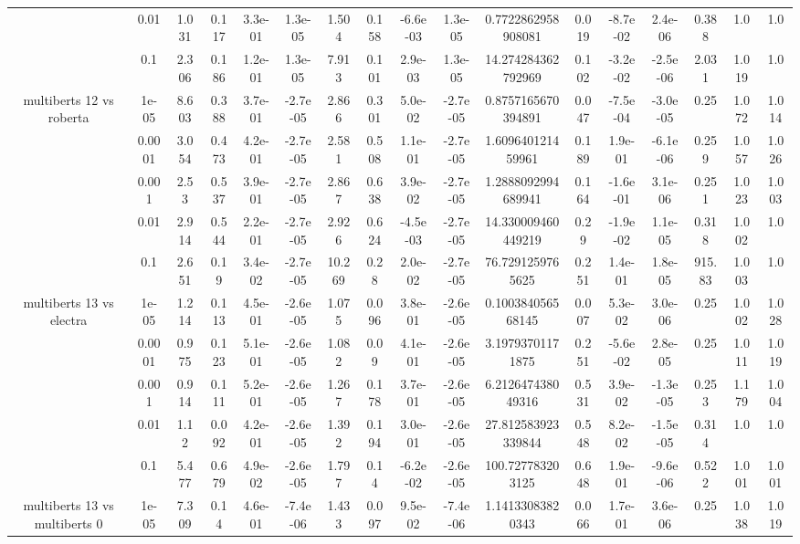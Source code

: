 \begin{tabular}{|c|c|c|c|c|c|c|c|c|c|c|c|c|c|c|c|c|}
 & 0.01 & 1.031 & 0.117 & 3.3e-01 & 1.3e-05 & 1.504 & 0.158 & -6.6e-03 & 1.3e-05 & 0.7722862958908081 & 0.019 & -8.7e-02 & 2.4e-06 & 0.388 & 1.0 & 1.0 \\
 & 0.1 & 2.306 & 0.186 & 1.2e-01 & 1.3e-05 & 7.913 & 0.101 & 2.9e-03 & 1.3e-05 & 14.274284362792969 & 0.102 & -3.2e-02 & -2.5e-06 & 2.031 & 1.019 & 1.0 \\
\hline
\multirow{5}{*}{multiberts 12 vs roberta } & 1e-05 & 8.603 & 0.388 & 3.7e-01 & -2.7e-05 & 2.866 & 0.301 & 5.0e-02 & -2.7e-05 & 0.8757165670394891 & 0.047 & -7.5e-04 & -3.0e-05 & 0.25 & 1.072 & 1.014 \\
 & 0.0001 & 3.054 & 0.473 & 4.2e-01 & -2.7e-05 & 2.581 & 0.508 & 1.1e-01 & -2.7e-05 & 1.609640121459961 & 0.189 & 1.9e-01 & -6.1e-06 & 0.259 & 1.057 & 1.026 \\
 & 0.001 & 2.53 & 0.537 & 3.9e-01 & -2.7e-05 & 2.867 & 0.638 & 3.9e-02 & -2.7e-05 & 1.2888092994689941 & 0.164 & -1.6e-01 & 3.1e-06 & 0.251 & 1.023 & 1.003 \\
 & 0.01 & 2.914 & 0.544 & 2.2e-01 & -2.7e-05 & 2.926 & 0.624 & -4.5e-03 & -2.7e-05 & 14.330009460449219 & 0.29 & -1.9e-02 & 1.1e-05 & 0.318 & 1.002 & 1.0 \\
 & 0.1 & 2.651 & 0.19 & 3.4e-02 & -2.7e-05 & 10.269 & 0.28 & 2.0e-02 & -2.7e-05 & 76.7291259765625 & 0.251 & 1.4e-01 & 1.8e-05 & 915.83 & 1.003 & 1.0 \\
\hline
\multirow{5}{*}{multiberts 13 vs electra } & 1e-05 & 1.214 & 0.113 & 4.5e-01 & -2.6e-05 & 1.075 & 0.096 & 3.8e-01 & -2.6e-05 & 0.100384056568145 & 0.007 & 5.3e-02 & 3.0e-06 & 0.25 & 1.002 & 1.028 \\
 & 0.0001 & 0.975 & 0.123 & 5.1e-01 & -2.6e-05 & 1.082 & 0.09 & 4.1e-01 & -2.6e-05 & 3.19793701171875 & 0.251 & -5.6e-02 & 2.8e-05 & 0.25 & 1.011 & 1.019 \\
 & 0.001 & 0.914 & 0.111 & 5.2e-01 & -2.6e-05 & 1.267 & 0.178 & 3.7e-01 & -2.6e-05 & 6.212647438049316 & 0.531 & 3.9e-02 & -1.3e-05 & 0.253 & 1.179 & 1.004 \\
 & 0.01 & 1.12 & 0.092 & 4.2e-01 & -2.6e-05 & 1.392 & 0.194 & 3.0e-01 & -2.6e-05 & 27.812583923339844 & 0.548 & 8.2e-02 & -1.5e-05 & 0.314 & 1.0 & 1.0 \\
 & 0.1 & 5.477 & 0.679 & 4.9e-02 & -2.6e-05 & 1.797 & 0.14 & -6.2e-02 & -2.6e-05 & 100.727783203125 & 0.648 & 1.9e-01 & -9.6e-06 & 0.522 & 1.001 & 1.001 \\
\hline
\multirow{5}{*}{multiberts 13 vs multiberts 0} & 1e-05 & 7.309 & 0.14 & 4.6e-01 & -7.4e-06 & 1.433 & 0.097 & 9.5e-02 & -7.4e-06 & 1.14133083820343 & 0.066 & 1.7e-01 & 3.6e-06 & 0.25 & 1.038 & 1.019 \\

\end{tabular}
